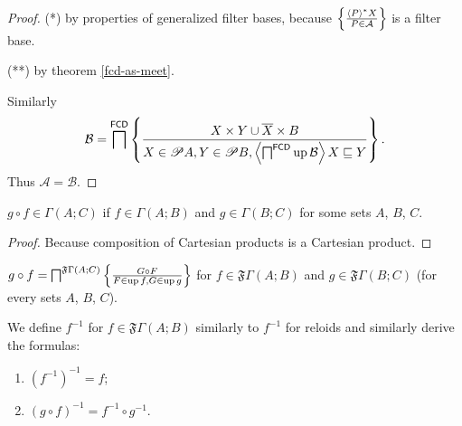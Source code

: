 \begin{proof}
({*}) by properties of generalized filter bases, because $\left\{ \frac{\left\langle P\right\rangle ^{\ast}X}{P\in\mathcal{A}}\right\}$
is a filter base.

({*}{*}) by theorem \ref{fcd-as-meet}.

Similarly 
\[
\mathcal{B}=\bigsqcap^{\mathsf{FCD}}\left\{ \frac{X\times Y\cup\overline{X}\times B}{X\in\mathscr{P} A,Y\in\mathscr{P} B,\left\langle \bigsqcap^{\mathsf{FCD}}\operatorname{up}\mathcal{B}\right\rangle X\sqsubseteq Y}\right\}.
\]
Thus $\mathcal{A}=\mathcal{B}$.\end{proof}
\begin{prop}
$g\circ f\in\Gamma(A;C)$ if $f\in\Gamma(A;B)$ and $g\in\Gamma(B;C)$
for some sets $A$, $B$, $C$.\end{prop}
\begin{proof}
Because composition of Cartesian products is a Cartesian product.\end{proof}
\begin{defn}
$g\circ f=\bigsqcap^{\mathfrak{F}\Gamma(A;C)}\left\{ \frac{G\circ F}{F\in\operatorname{up} f,G\in\operatorname{up} g}\right\}$
for $f\in\mathfrak{F}\Gamma(A;B)$ and $g\in\mathfrak{F}\Gamma(B;C)$
(for every sets $A$, $B$, $C$).
\end{defn}
We define $f^{-1}$ for $f\in\mathfrak{F}\Gamma(A;B)$ similarly to
$f^{-1}$ for reloids and similarly derive the formulas:
\begin{enumerate}
\item $(f^{-1})^{-1}=f$;
\item $(g\circ f)^{-1}=f^{-1}\circ g^{-1}$.
\end{enumerate}

